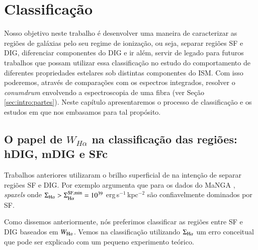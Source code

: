 
\chapter{Classificação}
\label{sec:DIGclass}

Nosso objetivo neste trabalho é desenvolver uma maneira de caracterizar as regiões de galáxias pelo seu regime de ionização, ou seja, separar regiões SF e DIG, diferenciar componentes do DIG e ir além, servir de legado para futuros trabalhos que possam utilizar essa classificação no estudo do comportamento de diferentes propriedades estelares sob distintas componentes do ISM. Com isso poderemos, através de comparações com os espectros integrados, resolver o {\em conumdrum} envolvendo a espectroscopia de uma fibra (ver Seção \ref{sec:intro:partes}). Neste capítulo apresentaremos o processo de classificação e os estudos em que nos embasamos para tal propósito.

\section{O papel de $W_{H\alpha}$ na classificação das regiões: hDIG, mDIG e SFc}
\label{sec:DIGclass:WHa}

Trabalhos anteriores utilizaram o brilho superficial de \Ha na intenção de separar regiões SF e DIG. Por exemplo \citet{Zhang.etal.2017a} argumenta que para os dados do MaNGA \citep{Bundy.etal.2015}, {\em spaxels} onde $\Sigma_{\Ha} > \Sigma_{\Ha}^{\rm SF,min} = 10^{39}$ erg$\,$s$^{-1}\,$kpc$^{-2}$ são confiavelmente dominados por SF.

Como dissemos anteriormente, nós preferimos classificar as regiões entre SF e DIG baseados em $W_{\Ha}$. Vemos na classificação utilizando $\Sigma_{\Ha}$ um erro conceitual que pode ser explicado com um pequeno experimento teórico.

